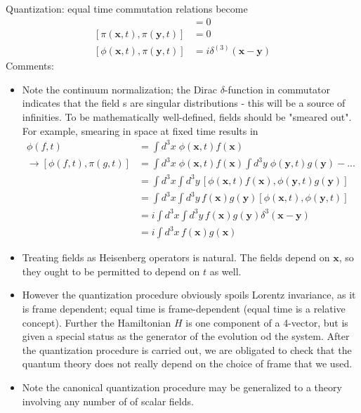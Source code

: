 \documentclass{article}
\begin{document}
Quantization: equal time commutation relations become
\begin{align}
[\phi(\mathbf{x},t),\phi(\mathbf{y},t)]&=0\\
[\pi(\mathbf{x},t),\pi(\mathbf{y},t)]&=0\\
[\phi(\mathbf{x},t),\pi(\mathbf{y},t)]&=i\delta^{(3)}(\mathbf{x}-\mathbf{y})
\end{align}
Comments:
\begin{itemize}
\item Note the continuum normalization; the Dirac $\delta$-function in commutator indicates that the field s are singular distributions - this will be a source of infinities. To be mathematically well-defined, fields should be "smeared out". For example, smearing in space at fixed time results in
\begin{align}
\phi(f,t)&=\int d^3x\;\phi(\mathbf{x},t)f(\mathbf{x})\\
\rightarrow [\phi(f,t),\pi(g,t)]
&=\int d^3x\;\phi(\mathbf{x},t)f(\mathbf{x})\int d^3y\;\phi(\mathbf{y},t)g(\mathbf{y})-...\\
&=\int d^3x\int d^3y\,[\phi(\mathbf{x},t)f(\mathbf{x}),\phi(\mathbf{y},t)g(\mathbf{y})]\\
&=\int d^3x\int d^3y\,f(\mathbf{x})g(\mathbf{y})[\phi(\mathbf{x},t),\phi(\mathbf{y},t)]\\
&=i\int d^3x\int d^3y\,f(\mathbf{x})g(\mathbf{y})\delta^3(\mathbf{x}-\mathbf{y})\\
&=i\int d^3x\,f(\mathbf{x})g(\mathbf{x})
\end{align}
\item Treating fields as Heisenberg operators is natural. The fields depend on $\mathbf{x}$, so they ought to be permitted to depend on $t$ as well.
\item However the quantization procedure obviously spoils Lorentz invariance, as it is frame dependent; equal time is frame-dependent (equal time is a relative concept). Further the Hamiltonian $H$ is one component of a 4-vector, but is given a special status as the generator of the evolution od the system. After the quantization procedure is carried out, we are obligated to check that the quantum theory does not really depend on the choice of frame that we used.
\item Note the canonical quantization procedure may be generalized to a theory involving any number of of scalar fields.
\end{itemize}
\end{document}
